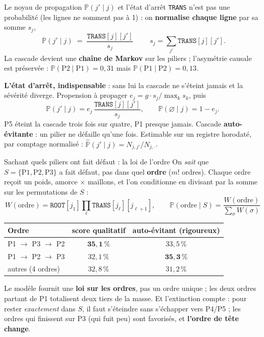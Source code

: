 \documentclass[11pt]{beamer}
\begin{document}
\begin{frame}{Le noyau de propagation $\mathbb{P}(j' \mid j)$ et l'état d'arrêt}
\texttt{TRANS} n'est pas une probabilité (les lignes ne somment pas à 1) : on
\textbf{normalise chaque ligne} par sa somme $s_j$,
\[
\boxed{\;\mathbb{P}(j' \mid j) \;=\; \frac{\texttt{TRANS}[j][j']}{s_j}\;}
\qquad s_j = \textstyle\sum_{j'} \texttt{TRANS}[j][j'].
\]
La cascade devient une \textbf{chaîne de Markov} sur les piliers ; l'asymétrie causale
est préservée : $\mathbb{P}(\text{P2} \mid \text{P1}) = 0{,}31$ mais
$\mathbb{P}(\text{P1} \mid \text{P2}) = 0{,}13$.
\medskip

\textbf{L'état d'arrêt, indispensable} : sans lui la cascade ne s'éteint jamais et la
sévérité diverge. Propension à propager $e_j = g \cdot s_j / \max_k s_k$, puis
\[
\mathbb{P}(j' \mid j) = e_j\,\frac{\texttt{TRANS}[j][j']}{s_j},
\qquad
\mathbb{P}(\varnothing \mid j) = 1 - e_j .
\]
P5 éteint la cascade trois fois sur quatre, P1 presque jamais. Cascade
\textbf{auto-évitante} : un pilier ne défaille qu'une fois. Estimable sur un registre
horodaté, par comptage normalisé : $\widehat{\mathbb{P}}(j' \mid j) = N_{j,j'} / N_{j,\cdot}$.
\end{frame}

\begin{frame}{Sachant quels piliers ont fait défaut : la loi de l'ordre}
On \emph{sait} que $S = \{\text{P1}, \text{P2}, \text{P3}\}$ a fait défaut, pas dans quel
\textbf{ordre} ($m!$ ordres). Chaque ordre reçoit un poids, amorce $\times$ maillons, et
l'on conditionne en divisant par la somme sur les permutations de $S$ :
\[
W(\text{ordre}) = \texttt{ROOT}[j_1] \textstyle\prod_{\ell} \texttt{TRANS}[j_\ell][j_{\ell+1}],
\qquad
\mathbb{P}(\text{ordre} \mid S) = \frac{W(\text{ordre})}{\sum_{\sigma} W(\sigma)}
\]
\begin{center}\footnotesize
\renewcommand{\arraystretch}{1.1}
\begin{tabular}{@{}lcc@{}}
\toprule
Ordre & score qualitatif & auto-évitant (rigoureux) \\
\midrule
P1 $\to$ P3 $\to$ P2 & $\mathbf{35{,}1\,\%}$ & $33{,}5\,\%$ \\
P1 $\to$ P2 $\to$ P3 & $32{,}1\,\%$ & $\mathbf{35{,}3\,\%}$ \\
autres (4 ordres)    & $32{,}8\,\%$ & $31{,}2\,\%$ \\
\bottomrule
\end{tabular}
\end{center}
\medskip
Le modèle fournit une \textbf{loi sur les ordres}, pas un ordre unique ; les deux ordres
partant de P1 totalisent deux tiers de la masse. Et l'extinction compte : pour rester
\emph{exactement} dans $S$, il faut s'éteindre sans s'échapper vers P4/P5 ; les ordres
qui finissent sur P3 (qui fuit peu) sont favorisés, et \textbf{l'ordre de tête change}.
\end{frame}
\end{document}
